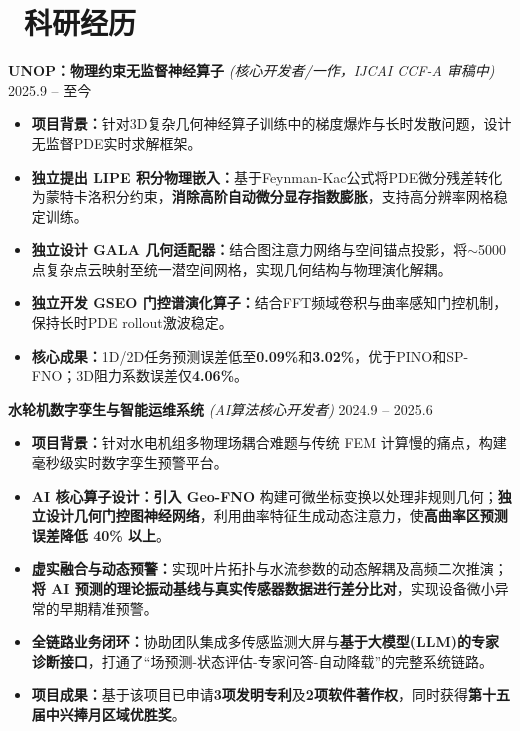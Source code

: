 \documentclass[11pt]{article}
\newlength{\interProjectSpacing}
\newcommand{\projectsep}{\vspace{\interProjectSpacing}}
\begin{document}
\section{\makebox[\widthof{\faUsers}][c]{\color{CVBlue}\faUsers}\ 科研经历}

\textbf{UNOP：物理约束无监督神经算子} \textit{(核心开发者/一作，IJCAI CCF-A 审稿中)} \hfill 2025.9 -- 至今
\begin{itemize}
    \item \textbf{项目背景：}针对3D复杂几何神经算子训练中的梯度爆炸与长时发散问题，设计无监督PDE实时求解框架。
    \item \textbf{独立提出 LIPE 积分物理嵌入：}基于Feynman-Kac公式将PDE微分残差转化为蒙特卡洛积分约束，\textbf{消除高阶自动微分显存指数膨胀}，支持高分辨率网格稳定训练。
    \item \textbf{独立设计 GALA 几何适配器：}结合图注意力网络与空间锚点投影，将$\sim$5000点复杂点云映射至统一潜空间网格，实现几何结构与物理演化解耦。
    \item \textbf{独立开发 GSEO 门控谱演化算子：}结合FFT频域卷积与曲率感知门控机制，保持长时PDE rollout激波稳定。
    \item \textbf{核心成果：}1D/2D任务预测误差低至\textbf{0.09\%}和\textbf{3.02\%}，优于PINO和SP-FNO；3D阻力系数误差仅\textbf{4.06\%}。
\end{itemize}

\projectsep

\textbf{水轮机数字孪生与智能运维系统} \textit{(AI算法核心开发者)} \hfill 2024.9 -- 2025.6
\begin{itemize}
    \item \textbf{项目背景：}针对水电机组多物理场耦合难题与传统 FEM 计算慢的痛点，构建毫秒级实时数字孪生预警平台。
    \item \textbf{AI 核心算子设计：}\textbf{引入 Geo-FNO} 构建可微坐标变换以处理非规则几何；\textbf{独立设计几何门控图神经网络}，利用曲率特征生成动态注意力，使\textbf{高曲率区预测误差降低 40\% 以上}。
    \item \textbf{虚实融合与动态预警：}实现叶片拓扑与水流参数的动态解耦及高频二次推演；\textbf{将 AI 预测的理论振动基线与真实传感器数据进行差分比对}，实现设备微小异常的早期精准预警。
    \item \textbf{全链路业务闭环：}协助团队集成多传感监测大屏与\textbf{基于大模型(LLM)的专家诊断接口}，打通了“场预测-状态评估-专家问答-自动降载”的完整系统链路。
    \item \textbf{项目成果：}基于该项目已申请\textbf{3项发明专利}及\textbf{2项软件著作权}，同时获得\textbf{第十五届中兴捧月区域优胜奖}。
\end{itemize}
\end{document}
